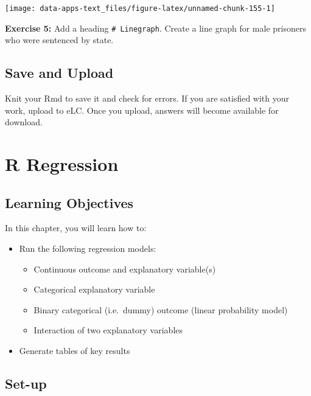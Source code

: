 \documentclass[
]{book}
\providecommand{\tightlist}{%
  \setlength{\itemsep}{0pt}\setlength{\parskip}{0pt}}
\newenvironment{rmdblock}[1]
  {\begin{shaded*}
  }
  {\end{shaded*}
  }
\newenvironment{learncheck}
  {\begin{rmdblock}{warning}}
  {\end{rmdblock}}
\begin{document}
\begin{center}\texttt{[image: data-apps-text\_files/figure-latex/unnamed-chunk-155-1]} \end{center}

\begin{learncheck}
\textbf{Exercise 5:} Add a heading \texttt{\#\ Linegraph}. Create a line
graph for male prisoners who were sentenced by state.
\end{learncheck}

\hypertarget{save-and-upload-4}{%
\section{Save and Upload}\label{save-and-upload-4}}

Knit your Rmd to save it and check for errors. If you are satisfied with your work, upload to eLC. Once you upload, answers will become available for download.

\hypertarget{r-regression}{%
\chapter{R Regression}\label{r-regression}}

\hypertarget{learning-objectives-4}{%
\section{Learning Objectives}\label{learning-objectives-4}}

In this chapter, you will learn how to:

\begin{itemize}
\tightlist
\item
  Run the following regression models:

  \begin{itemize}
  \tightlist
  \item
    Continuous outcome and explanatory variable(s)
  \item
    Categorical explanatory variable
  \item
    Binary categorical (i.e.~dummy) outcome (linear probability model)
  \item
    Interaction of two explanatory variables
  \end{itemize}
\item
  Generate tables of key results
\end{itemize}

\hypertarget{set-up-4}{%
\section{Set-up}\label{set-up-4}}
\end{document}
